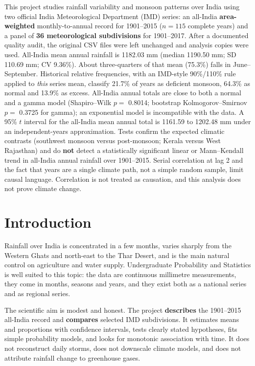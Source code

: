 \documentclass[
]{article}
\begin{document}
This project studies rainfall variability and monsoon patterns over
India using two official India Meteorological Department (IMD) series:
an all-India \textbf{area-weighted} monthly-to-annual record for
1901--2015 (\(n = 115\) complete years) and a panel of \textbf{36
meteorological subdivisions} for 1901--2017. After a documented quality
audit, the original CSV files were left unchanged and analysis copies
were used. All-India mean annual rainfall is 1182.03 mm (median 1190.50
mm; SD 110.69 mm; CV 9.36\%). About three-quarters of that mean (75.3\%)
falls in June--September. Historical relative frequencies, with an
IMD-style 90\%/110\% rule applied to \emph{this} series mean, classify
21.7\% of years as deficient monsoon, 64.3\% as normal and 13.9\% as
excess. All-India annual totals are close to both a normal and a gamma
model (Shapiro--Wilk \(p =\) 0.8014; bootstrap Kolmogorov--Smirnov
\(p =\) 0.3725 for gamma); an exponential model is incompatible with the
data. A 95\% \(t\) interval for the all-India mean annual total is
1161.59 to 1202.48 mm under an independent-years approximation. Tests
confirm the expected climatic contrasts (southwest monsoon versus
post-monsoon; Kerala versus West Rajasthan) and do \textbf{not} detect a
statistically significant linear or Mann--Kendall trend in all-India
annual rainfall over 1901--2015. Serial correlation at lag 2 and the
fact that years are a single climate path, not a simple random sample,
limit causal language. Correlation is not treated as causation, and this
analysis does not prove climate change.

\section{Introduction}\label{introduction}

Rainfall over India is concentrated in a few months, varies sharply from
the Western Ghats and north-east to the Thar Desert, and is the main
natural control on agriculture and water supply. Undergraduate
Probability and Statistics is well suited to this topic: the data are
continuous millimetre measurements, they come in months, seasons and
years, and they exist both as a national series and as regional series.

The scientific aim is modest and honest. The project \textbf{describes}
the 1901--2015 all-India record and \textbf{compares} selected IMD
subdivisions. It estimates means and proportions with confidence
intervals, tests clearly stated hypotheses, fits simple probability
models, and looks for monotonic association with time. It does not
reconstruct daily storms, does not downscale climate models, and does
not attribute rainfall change to greenhouse gases.
\end{document}
